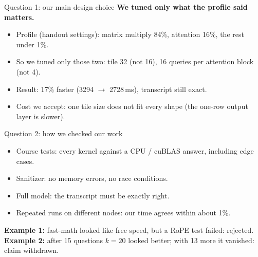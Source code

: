 \documentclass[aspectratio=169,12pt]{beamer}
\begin{document}
\begin{frame}{Question 1: our main design choice}
\textbf{We tuned only what the profile said matters.}
\begin{itemize}
\item Profile (handout settings): matrix multiply 84\%, attention 16\%, the rest under 1\%.
\item So we tuned only those two: tile 32 (not 16), 16 queries per attention block (not 4).
\item Result: 17\% faster (3294 $\to$ 2728\,ms), transcript still exact.
\item Cost we accept: one tile size does not fit every shape (the one-row output layer is slower).
\end{itemize}
\end{frame}

\begin{frame}{Question 2: how we checked our work}
\begin{itemize}
\item Course tests: every kernel against a CPU / cuBLAS answer, including edge cases.
\item Sanitizer: no memory errors, no race conditions.
\item Full model: the transcript must be exactly right.
\item Repeated runs on different nodes: our time agrees within about 1\%.
\end{itemize}
\textbf{Example 1:} fast-math looked like free speed, but a RoPE test failed: rejected.\\
\textbf{Example 2:} after 15 questions $k=20$ looked better; with 13 more it vanished: claim withdrawn.
\end{frame}
\end{document}
